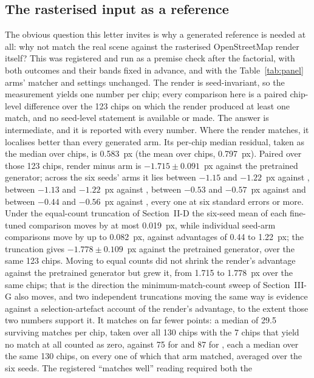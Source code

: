 \subsection{The rasterised input as a reference}

The obvious question this letter invites is why a generated reference is needed at all:
why not match the real scene against the rasterised OpenStreetMap render itself? This was
registered and run as a premise check after the factorial, with both outcomes and their
bands fixed in advance, and with the Table~\ref{tab:panel} arms' matcher and settings
unchanged. The render is seed-invariant, so the measurement yields one number per chip; every
comparison here is a paired chip-level difference over the 123 chips on which the render
produced at least one match, and no seed-level statement is available or made. The answer is intermediate, and it is reported with every
number. Where the render matches, it localises better than every generated arm. Its per-chip median residual, taken as the median over chips, is 0.583~px (the mean over
chips, 0.797~px). Paired over those 123 chips, render minus arm is $-1.715 \pm 0.091$~px
against the pretrained generator; across the six seeds' arms it lies
between $-1.15$ and $-1.22$~px against \advLone{}, between $-1.13$ and $-1.22$~px against
\advLPIPS{}, between $-0.53$ and $-0.57$~px against \LPIPSonly{} and between $-0.44$ and
$-0.56$~px against \Lone{}, every one at six standard errors or more. Under the equal-count
truncation of Section~II-D the six-seed mean of each fine-tuned
comparison moves by at most 0.019~px, while individual seed-arm comparisons move by up to
0.082~px, against advantages of 0.44 to 1.22~px; the truncation gives
$-1.778 \pm 0.109$~px against the pretrained generator, over the same 123 chips.
Moving to equal counts did not shrink the render's advantage against the pretrained
generator but grew it, from 1.715 to 1.778~px over the same chips; that is the direction
the minimum-match-count sweep of Section~III-G also moves, and two independent
truncations moving the same way is evidence against a selection-artefact account of the
render's advantage, to the extent those two numbers support it. It matches on far fewer points: a median of 29.5 surviving matches per chip, taken over
all 130 chips with the 7 chips that yield no match at all counted as zero, against 75 for
\Lone{} and 87 for \LPIPSonly{}, each a median over the same 130 chips, on every one of which
that arm matched, averaged over the six seeds. The registered ``matches well'' reading required both the
